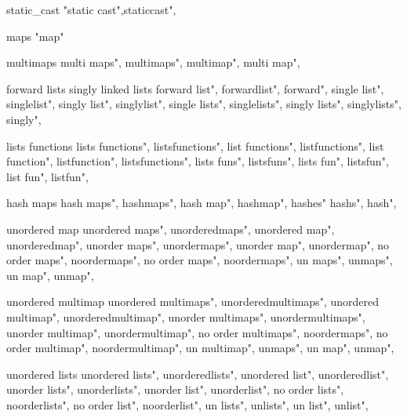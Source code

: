          static_cast 
         "static cast",staticcast",
        
         maps
         "map"
        
         multimaps
        multi maps",
        multimaps", 
        multimap",
        multi map", 
        
         forward lists singly linked lists
        forward list",  
        forwardlist",  
        forward",  
        single list",  
        singlelist",  
        singly list",  
        singlylist",  
        single lists",  
        singlelists",  
        singly lists",  
        singlylists",  
        singly",  
        
         lists functions 
        lists functions",  
        listsfunctions",  
        list functions",  
        listfunctions",  
        list function",  
        listfunction",  
        listsfunctions",  
        lists funs",  
        listsfuns",  
        lists fun",  
        listsfun",  
        list fun",  
        listfun",  
         
         hash maps 
        hash maps",
        hashmaps", 
        hash map", 
        hashmap",
        hashes"
        hashs",
        hash",
        
         unordered map 
        unordered maps", 
        unorderedmaps", 
        unordered map", 
        unorderedmap", 
        unorder maps", 
        unordermaps", 
        unorder map", 
        unordermap", 
        no order maps", 
        noordermaps", 
        no order maps", 
        noordermaps", 
        un maps", 
        unmaps", 
        un map", 
        unmap", 
         
         unordered multimap 
        unordered multimaps", 
        unorderedmultimaps", 
        unordered multimap", 
        unorderedmultimap", 
        unorder multimaps", 
        unordermultimaps", 
        unorder multimap", 
        unordermultimap", 
        no order multimaps", 
        noordermaps", 
        no order multimap", 
        noordermultimap", 
        un multimap", 
        unmaps", 
        un map", 
        unmap", 
        
         unordered lists 
        unordered lists", 
        unorderedlists", 
        unordered list", 
        unorderedlist", 
        unorder lists", 
        unorderlists", 
        unorder list", 
        unorderlist", 
        no order lists", 
        noorderlists", 
        no order list", 
        noorderlist", 
        un lists", 
        unlists", 
        un list", 
        unlist", 
        

